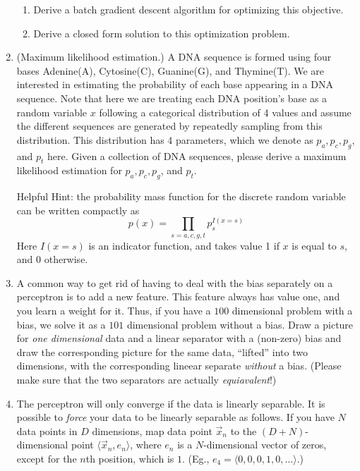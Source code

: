\documentclass{article}
\begin{document}
\begin{enumerate}
\begin{enumerate}
     \item Derive a batch gradient descent algorithm for optimizing this objective.\\

     \item Derive a closed form solution to this optimization problem.

\end{enumerate}

\item (Maximum likelihood estimation.) A DNA sequence is formed using four bases Adenine(A), Cytosine(C), Guanine(G), and Thymine(T). We are interested in estimating the probability of each base appearing in a DNA sequence. Note that here we are treating each DNA position's base as a random variable $x$ following a categorical distribution of 4 values and assume the different sequences are generated by repeatedly sampling from this distribution. This distribution has 4 parameters, which we denote as $p_a, p_c, p_g$, and $p_t$ here. Given a collection of DNA sequences, please derive a maximum likelihood estimation for $p_a, p_c, p_g$, and $p_t$.

    Helpful Hint: the probability mass function for the discrete random variable can be written compactly as \[p(x) = \prod_{s=a,c,g,t}p_s^{I(x=s)}\]
Here $I(x=s)$ is an indicator function, and takes value 1 if $x$ is equal to $s$, and 0 otherwise.\\


\item A common way to get rid of having to deal with the bias
  separately on a perceptron is to add a new feature.  This feature
  always has value one, and you learn a weight for it.  Thus, if you
  have a $100$ dimensional problem with a bias, we solve it as a $101$
  dimensional problem without a bias.  Draw a picture for \emph{one
    dimensional} data and a linear separator with a (non-zero) bias
  and draw the corresponding picture for the same data, ``lifted''
  into two dimensions, with the corresponding lineear separate
  \emph{without} a bias.  (Please make sure that the two separators
  are actually \emph{equiavalent}!)

  \item The perceptron will only converge if the data is linearly
  separable. It is possible to \emph{force} your data to be linearly
  separable as follows.  If you have $N$ data points in $D$
  dimensions, map data point $\vec x_n$ to the $(D+N)$-dimensional
  point $\langle \vec x_n, e_n \rangle$, where $e_n$ is a
  $N$-dimensional vector of zeros, except for the $n$th position,
  which is $1$.  (Eg., $e_4 = \langle 0, 0, 0, 1, 0, \dots \rangle$.)


\end{enumerate}
\end{document}
